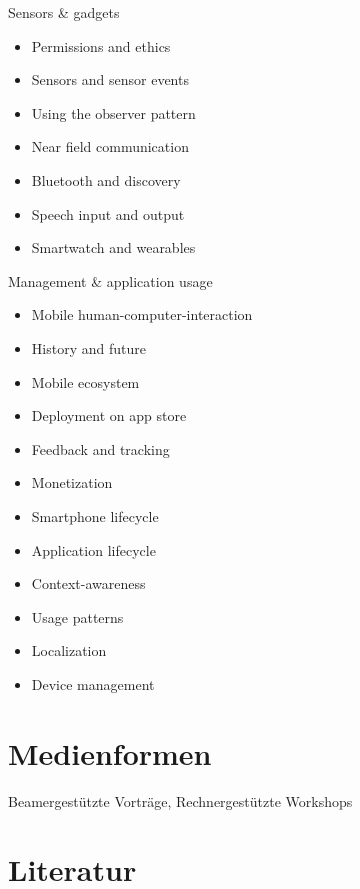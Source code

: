 Sensors \& gadgets

\begin{itemize}
\tightlist
\item
  Permissions and ethics
\item
  Sensors and sensor events
\item
  Using the observer pattern
\item
  Near field communication
\item
  Bluetooth and discovery
\item
  Speech input and output
\item
  Smartwatch and wearables
\end{itemize}

Management \& application usage

\begin{itemize}
\tightlist
\item
  Mobile human-computer-interaction
\item
  History and future
\item
  Mobile ecosystem
\item
  Deployment on app store
\item
  Feedback and tracking
\item
  Monetization
\item
  Smartphone lifecycle
\item
  Application lifecycle
\item
  Context-awareness
\item
  Usage patterns
\item
  Localization
\item
  Device management
\end{itemize}

\hypertarget{medienformenpathlabelmi-2017modulbeschreibungen-bachelorba_mobile-computing}{%
\section*{Medienformen\label{/mi-2017/modulbeschreibungen-bachelor/BA_Mobile-Computing}}\label{medienformenpathlabelmi-2017modulbeschreibungen-bachelorba_mobile-computing}}

Beamergestützte Vorträge, Rechnergestützte Workshops

\hypertarget{literaturpathlabelmi-2017modulbeschreibungen-bachelorba_mobile-computing}{%
\section*{Literatur\label{/mi-2017/modulbeschreibungen-bachelor/BA_Mobile-Computing}}\label{literaturpathlabelmi-2017modulbeschreibungen-bachelorba_mobile-computing}}

